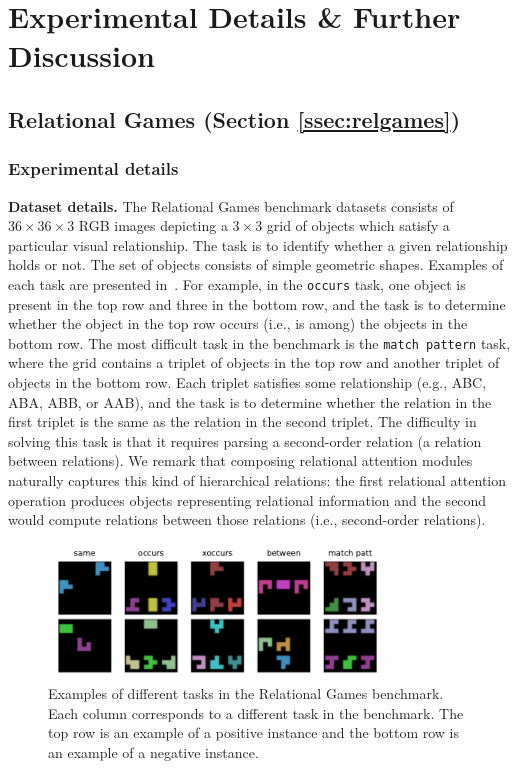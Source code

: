 \section{Experimental Details \& Further Discussion}\label{sec:appendix_experimental_details}

\subsection{Relational Games (Section \ref{ssec:relgames})}\label{ssec:appendxi_relgames}

\subsubsection*{Experimental details}

\textbf{Dataset details.} The Relational Games benchmark datasets consists of $36 \times 36 \times 3$ RGB images depicting a $3 \times 3$ grid of objects which satisfy a particular visual relationship. The task is to identify whether a given relationship holds or not. The set of objects consists of simple geometric shapes. Examples of each task are presented in~. For example, in the \texttt{occurs} task, one object is present in the top row and three in the bottom row, and the task is to determine whether the object in the top row occurs (i.e., is among) the objects in the bottom row. The most difficult task in the benchmark is the \texttt{match pattern} task, where the grid contains a triplet of objects in the top row and another triplet of objects in the bottom row. Each triplet satisfies some relationship (e.g., ABC, ABA, ABB, or AAB), and the task is to determine whether the relation in the first triplet is the same as the relation in the second triplet. The difficulty in solving this task is that it requires parsing a second-order relation (a relation between relations). We remark that composing relational attention modules naturally captures this kind of hierarchical relations: the first relational attention operation produces objects representing relational information and the second would compute relations between those relations (i.e., second-order relations).

\begin{figure}
    \centering
    \includegraphics[width=0.8\textwidth]{figs/experiments/relgames/relational_games_tasks.pdf}
    \caption{Examples of different tasks in the Relational Games benchmark. Each column corresponds to a different task in the benchmark. The top row is an example of a positive instance and the bottom row is an example of a negative instance.}\label{fig:relgames_examples}
\end{figure}

